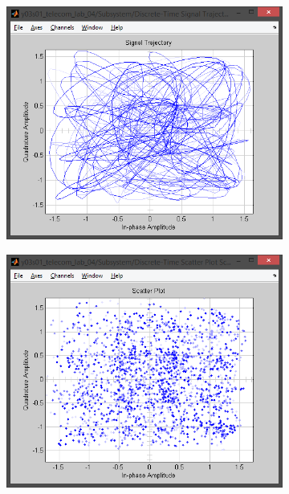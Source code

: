 \documentclass[
	a4paper,
	oneside,
	BCOR = 10mm,
	DIV = 12,
	12pt,
	headings = normal,
]{scrartcl}
\begin{document}
\begin{figure}[!htbp]
\begin{subfigure}{\textwidth / 3}
						\caption{}
						\label{subfig:rolloff-0p2-eye-out}
					\end{subfigure}%
					\begin{subfigure}{\textwidth / 3}
						\centering
						\includegraphics[height = 7\baselineskip]{../01-solution/rolloff-0p2-signal-trajectory-out.png}
						\caption{}
						\label{subfig:rolloff-0p2-signal-trajectory-out}
					\end{subfigure}%
					\begin{subfigure}{\textwidth / 3}
						\centering
						\includegraphics[height = 7\baselineskip]{../01-solution/rolloff-0p2-scatter-plot-out.png}

\end{subfigure}
\end{figure}
\end{document}
